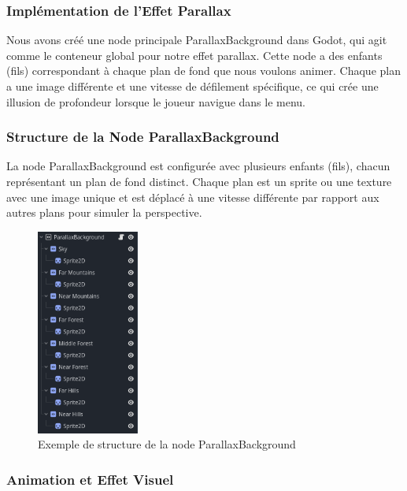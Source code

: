 \subsubsection{Implémentation de l'Effet Parallax}

Nous avons créé une node principale ParallaxBackground dans Godot, qui agit comme le conteneur global pour notre effet parallax.
Cette node a des enfants (fils) correspondant à chaque plan de fond que nous voulons animer. Chaque plan a une image différente et une vitesse de défilement spécifique, ce qui crée une illusion de profondeur lorsque le joueur navigue dans le menu.

\subsubsection{Structure de la Node ParallaxBackground}

La node ParallaxBackground est configurée avec plusieurs enfants (fils), chacun représentant un plan de fond distinct.
Chaque plan est un sprite ou une texture avec une image unique et est déplacé à une vitesse différente par rapport aux autres plans pour simuler la perspective.
\\

\begin{figure}[H]
      \centering
      \includegraphics[width=0.3\textwidth]{assets/paralax.png}
      \caption{Exemple de structure de la node ParallaxBackground}
      \label{fig:paralax}
\end{figure}

\subsubsection{Animation et Effet Visuel}

